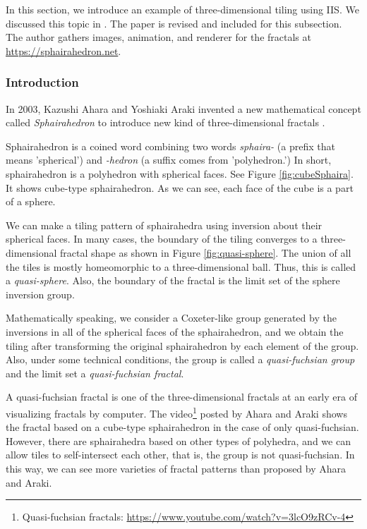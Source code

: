 \noindent In this section, we introduce an example of three-dimensional
tiling using IIS. 
We discussed this topic in \cite{bridges2018NakamuraAhara}. %
The paper is revised and included for this subsection.
The author gathers images, animation, and renderer for the fractals
at \url{https://sphairahedron.net}.

\subsubsection{Introduction}

In 2003, Kazushi Ahara and Yoshiaki Araki invented a new mathematical
concept called \textit{Sphairahedron} to introduce new kind of
three-dimensional fractals \cite{ahara2003sphairahedral}.

Sphairahedron is a coined word combining two words \textit{sphaira-}
(a prefix that means 'spherical') and \textit{-hedron} (a suffix comes
from 'polyhedron.')
In short, sphairahedron is a polyhedron with spherical faces.
See Figure \ref{fig:cubeSphaira}.
It shows cube-type sphairahedron. 
As we can see, each face of the cube is a part of a sphere.

\noindent
We can make a tiling pattern of sphairahedra using inversion about their
spherical faces.
In many cases, the boundary of the tiling converges to a three-dimensional fractal
shape as shown in Figure \ref{fig:quasi-sphere}.
The union of all the tiles is mostly homeomorphic to a three-dimensional
ball. Thus, this is called a \textit{quasi-sphere}.
Also, the boundary of the fractal is the limit set of the sphere
inversion group.

Mathematically speaking, we consider a Coxeter-like group generated by the
inversions in all of the spherical faces of the sphairahedron, and
we obtain the tiling after transforming the original sphairahedron by
each element of the group.
Also, under some technical conditions, the group is called a
\textit{quasi-fuchsian group} and the limit set a \textit{quasi-fuchsian
fractal}.

A quasi-fuchsian fractal is one of the three-dimensional
fractals at an early era of visualizing fractals by computer.
The video\footnote{Quasi-fuchsian fractals:
\url{https://www.youtube.com/watch?v=3lcO9zRCv-4}}
posted by Ahara and Araki shows the fractal based on a cube-type
sphairahedron in the case of only quasi-fuchsian.
However, there are sphairahedra based on other types of polyhedra, and
we can allow tiles to self-intersect each other, that is, the group is
not quasi-fuchsian.
In this way, we can see more varieties of fractal patterns
than proposed by Ahara and Araki.
         
